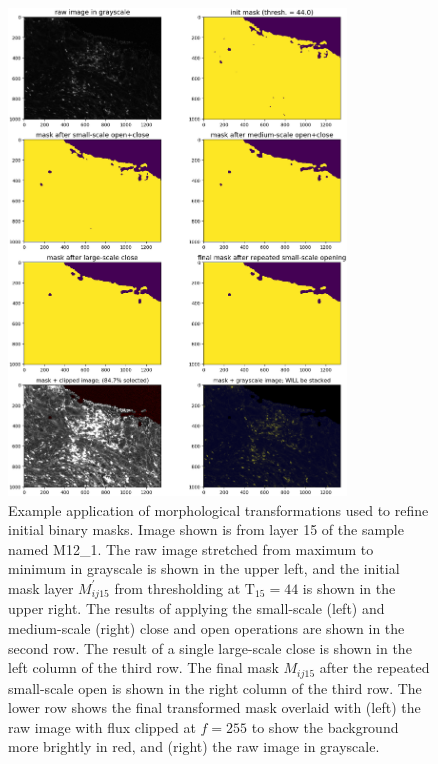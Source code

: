\documentclass[letterpaper,11pt]{article}
\newcommand{\Tau}{\mathrm{T}}
\begin{document}
\begin{figure}[!ht]
\centering
\includegraphics[width=0.8\textwidth]{images/masking/image_383_layer_15_masks}
\caption{\footnotesize Example application of morphological transformations used to refine initial binary masks. Image shown is from layer 15 of the sample named M12\_1. The raw image stretched from maximum to minimum in grayscale is shown in the upper left, and the initial mask layer $M^{\prime}_{ij15}$ from thresholding at $\Tau_{15}=44$ is shown in the upper right. The results of applying the small-scale (left) and medium-scale (right) close and open operations are shown in the second row. The result of a single large-scale close is shown in the left column of the third row. The final mask $M_{ij15}$ after the repeated small-scale open is shown in the right column of the third row. The lower row shows the final transformed mask overlaid with (left) the raw image with flux clipped at $f=255$ to show the background more brightly in red, and (right) the raw image in grayscale.}
\label{fig:mask_example_med}
\end{figure}
\end{document}
